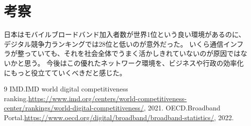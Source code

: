 \documentclass[11pt,a4paper]{jsarticle}
\begin{document}
\section{考察}
日本はモバイルブロードバンド加入者数が世界1位という良い環境があるのに、デジタル競争力ランキングでは28位と低いのが意外だった。
いくら通信インフラが整っていても、それを社会全体でうまく活かしきれていないのが原因ではないかと思う。
今後はこの優れたネットワーク環境を、ビジネスや行政の効率化にもっと役立てていくべきだと感じた。

\begin{thebibliography}{9}
   IMD.\quad IMD world digital competitiveness ranking.\quad \url{https://www.imd.org/centers/world-competitiveness-center/rankings/world-digital-competitiveness/}, 2021.
   OECD.\quad Broadband Portal.\quad \url{https://www.oecd.org/digital/broadband/broadband-statistics/}, 2022.
\end{thebibliography}
\end{document}
